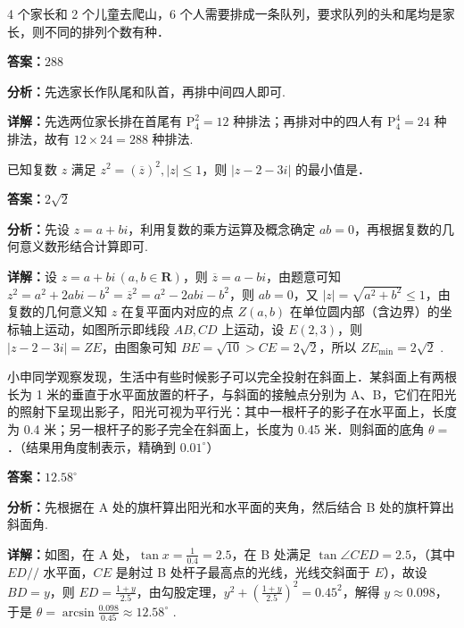 \begin{question}[points=5]
4 个家长和 2 个儿童去爬山，6 个人需要排成一条队列，要求队列的头和尾均是家长，则不同的排列个数有种．
\fillin[{$288$}]
\begin{solution}
\textbf{答案：}$288$

\textbf{分析：}先选家长作队尾和队首，再排中间四人即可.

\textbf{详解：}先选两位家长排在首尾有 $\mathrm{P}_4^2 = 12$ 种排法；再排对中的四人有 $\mathrm{P}_4^4 = 24$ 种排法，故有 $12 \times 24 = 288$ 种排法.
\end{solution}
\end{question}

\begin{question}[points=5]
已知复数 $z$ 满足 $z^2 = (\overline{z})^2, |z| \leq 1$，则 $|z - 2 - 3i|$ 的最小值是．
\fillin[{$2\sqrt{2}$}]
\begin{solution}
\textbf{答案：}$2\sqrt{2}$

\textbf{分析：}先设 $z = a + bi$，利用复数的乘方运算及概念确定 $ab = 0$，再根据复数的几何意义数形结合计算即可.

\textbf{详解：}设 $z = a + bi\,(a,b \in \mathbf{R})$，则 $\overline{z} = a - bi$，由题意可知 $z^2 = a^2 + 2abi - b^2 = \overline{z}^2 = a^2 - 2abi - b^2$，则 $ab = 0$，又 $|z| = \sqrt{a^2 + b^2} \leq 1$，由复数的几何意义知 $z$ 在复平面内对应的点 $Z(a,b)$ 在单位圆内部（含边界）的坐标轴上运动，如图所示即线段 $AB, CD$ 上运动，设 $E(2,3)$，则 $|z-2-3i| = ZE$，由图象可知 $BE = \sqrt{10} > CE = 2\sqrt{2}$，所以 $ZE_{\min} = 2\sqrt{2}$ .
\end{solution}
\end{question}

\begin{question}[points=5]
小申同学观察发现，生活中有些时候影子可以完全投射在斜面上．某斜面上有两根长为 1 米的垂直于水平面放置的杆子，与斜面的接触点分别为 A、B，它们在阳光的照射下呈现出影子，阳光可视为平行光：其中一根杆子的影子在水平面上，长度为 0.4 米；另一根杆子的影子完全在斜面上，长度为 0.45 米．则斜面的底角 $\theta =$ ．（结果用角度制表示，精确到 $0.01^\circ$）
\fillin[{$12.58^\circ$}]
\begin{solution}
\textbf{答案：}$12.58^\circ$

\textbf{分析：}先根据在 A 处的旗杆算出阳光和水平面的夹角，然后结合 B 处的旗杆算出斜面角.

\textbf{详解：}如图，在 A 处，$\tan x = \frac{1}{0.4} = 2.5$，在 B 处满足 $\tan \angle CED = 2.5$，（其中 $ED //$ 水平面，$CE$ 是射过 B 处杆子最高点的光线，光线交斜面于 $E$），故设 $BD = y$，则 $ED = \frac{1+y}{2.5}$，由勾股定理，$y^2 + \left(\frac{1+y}{2.5}\right)^2 = 0.45^2$，解得 $y \approx 0.098$，于是 $\theta = \arcsin\frac{0.098}{0.45} \approx 12.58^\circ$ .
\end{solution}
\end{question}

